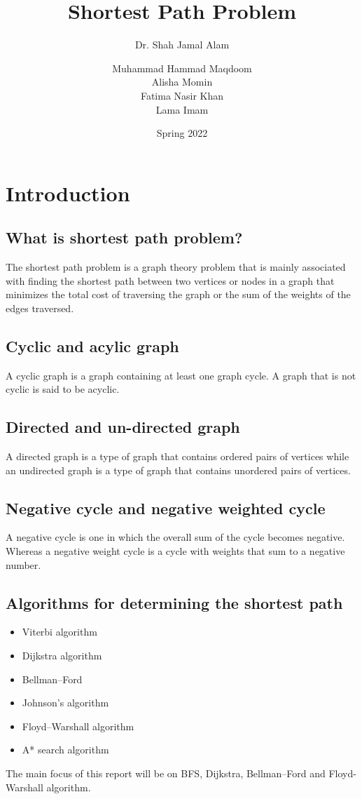 \documentclass[a4paper, 12pt]{report}
\institute{Habib University}
\title{Shortest Path Problem}
\subtitle{Dr. Shah Jamal Alam}
\author{Muhammad Hammad Maqdoom \\ Alisha Momin \\ Fatima Nasir Khan \\ Lama Imam}
\date{Spring 2022}
\begin{document}
    \maketitle
    \romantableofcontents
    \chapter{Introduction}
    \section{What is shortest path problem?}
	The shortest path problem is a graph theory problem that is mainly associated with finding the shortest path between two vertices or nodes in a graph that minimizes the total cost of traversing the graph or the sum of the weights of the edges traversed.\\
	\vspace{-0.9cm}
    \section{Cyclic and acylic graph}
    A cyclic graph is a graph containing at least one graph cycle. A graph that is not cyclic is said to be acyclic.\\
    \vspace{-0.9cm}
    \section{Directed and un-directed graph}
    A directed graph is a type of graph that contains ordered pairs of vertices while an undirected graph is a type of graph that contains unordered pairs of vertices.\\
    \vspace{-0.9cm}
    \section{Negative cycle and negative weighted cycle}
    A negative cycle is one in which the overall sum of the cycle becomes negative. Whereas a negative weight cycle is a cycle with weights that sum to a negative number. \\
    \vspace{-0.9cm}
    \section{Algorithms for determining the shortest path}
	\begin{itemize}
	\item Viterbi algorithm
    \item Dijkstra algorithm
    \item Bellman–Ford
    \item Johnson’s algorithm
    \item Floyd–Warshall algorithm
    \item A* search algorithm
    \end{itemize}
    The main focus of this report will be on BFS, Dijkstra, Bellman–Ford and Floyd- Warshall algorithm.
    
\end{document}
